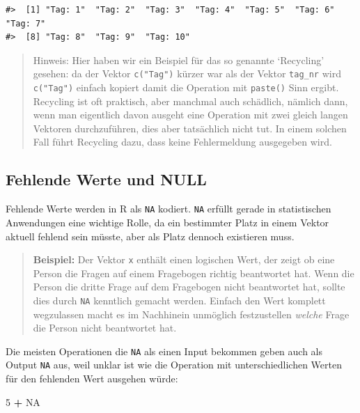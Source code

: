 \documentclass[]{book}
\newenvironment{Shaded}{\begin{snugshade}}{\end{snugshade}}
\newcommand{\DecValTok}[1]{\textcolor[rgb]{0.00,0.00,0.81}{#1}}
\newcommand{\StringTok}[1]{\textcolor[rgb]{0.31,0.60,0.02}{#1}}
\newcommand{\OtherTok}[1]{\textcolor[rgb]{0.56,0.35,0.01}{#1}}
\newcommand{\OperatorTok}[1]{\textcolor[rgb]{0.81,0.36,0.00}{\textbf{#1}}}
\begin{document}
\begin{verbatim}
#>  [1] "Tag: 1"  "Tag: 2"  "Tag: 3"  "Tag: 4"  "Tag: 5"  "Tag: 6"  "Tag: 7" 
#>  [8] "Tag: 8"  "Tag: 9"  "Tag: 10"
\end{verbatim}

\begin{quote}
Hinweis: Hier haben wir ein Beispiel für das so genannte `Recycling'
gesehen: da der Vektor \texttt{c("Tag")} kürzer war als der Vektor
\texttt{tag\_nr} wird \texttt{c("Tag")} einfach kopiert damit die
Operation mit \texttt{paste()} Sinn ergibt. Recycling ist oft praktisch,
aber manchmal auch schädlich, nämlich dann, wenn man eigentlich davon
ausgeht eine Operation mit zwei gleich langen Vektoren durchzuführen,
dies aber tatsächlich nicht tut. In einem solchen Fall führt Recycling
dazu, dass keine Fehlermeldung ausgegeben wird.
\end{quote}

\subsection{Fehlende Werte und NULL}\label{fehlende-werte-und-null}

Fehlende Werte werden in R als \texttt{NA} kodiert. \texttt{NA} erfüllt
gerade in statistischen Anwendungen eine wichtige Rolle, da ein
bestimmter Platz in einem Vektor aktuell fehlend sein müsste, aber als
Platz dennoch existieren muss.

\begin{quote}
\textbf{Beispiel:} Der Vektor \texttt{x} enthält einen logischen Wert,
der zeigt ob eine Person die Fragen auf einem Fragebogen richtig
beantwortet hat. Wenn die Person die dritte Frage auf dem Fragebogen
nicht beantwortet hat, sollte dies durch \texttt{NA} kenntlich gemacht
werden. Einfach den Wert komplett wegzulassen macht es im Nachhinein
unmöglich festzustellen \emph{welche} Frage die Person nicht beantwortet
hat.
\end{quote}

Die meisten Operationen die \texttt{NA} als einen Input bekommen geben
auch als Output \texttt{NA} aus, weil unklar ist wie die Operation mit
unterschiedlichen Werten für den fehlenden Wert ausgehen würde:

\begin{Shaded}
\begin{Highlighting}[]
\DecValTok{5} \OperatorTok{+}\StringTok{ }\OtherTok{NA}
\end{Highlighting}
\end{Shaded}
\end{document}
